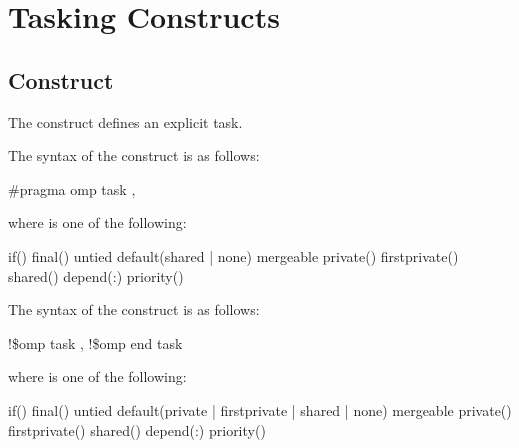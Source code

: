 \section{Tasking Constructs}
\label{sec:Tasking Constructs}
\subsection{ Construct}
\label{subsec:task Construct}
\summary
The  construct defines an explicit task.

\syntax
\ccppspecificstart
The syntax of the  construct is as follows: 

\begin{boxedcode}
\#pragma omp task \plc{[clause[ [},\plc{] clause] ... ] new-line}
\end{boxedcode}

\begin{samepage}
where  is one of the following: 

\begin{indentedcodelist}
if()
final()
untied
default(shared \textnormal{|} none)
mergeable
private()
firstprivate()
shared()
depend(:)
priority()
\end{indentedcodelist}
\ccppspecificend
\end{samepage}

\fortranspecificstart
The syntax of the  construct is as follows: 

\begin{boxedcode}
!\$omp task \plc{[clause[ [},\plc{] clause] ... ]}
!\$omp end task
\end{boxedcode}

where  is one of the following:

\begin{indentedcodelist}
if()
final()
untied
default(private \textnormal{|} firstprivate \textnormal{|} shared \textnormal{|} none)
mergeable
private()
firstprivate()
shared()
depend(:)
priority()
\end{indentedcodelist}
\fortranspecificend

